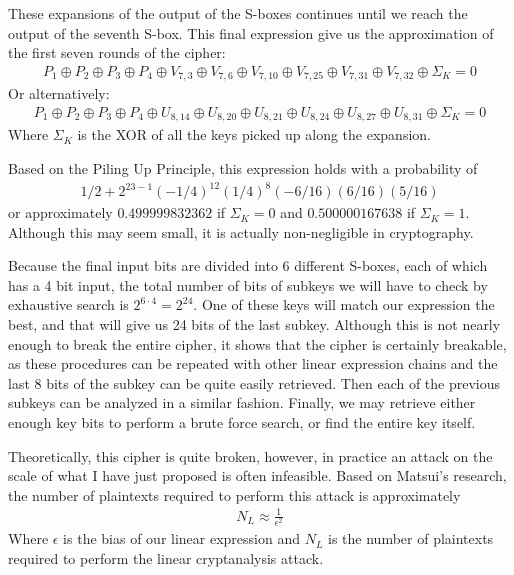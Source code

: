 \documentclass[12pt, a4paper, final]{report}
\begin{document}
These expansions of the output of the S-boxes continues until we reach the output of
the seventh S-box. This final expression give us the approximation of the first seven
rounds of the cipher:
\begin{align*}
    P_1 \oplus P_2 \oplus P_3 \oplus P_4 \oplus V_{7,3} \oplus V_{7,6} \oplus V_{7,10}
    \oplus V_{7,25} \oplus V_{7,31} \oplus V_{7,32} \oplus \Sigma_K= 0
\end{align*}
Or alternatively:
\begin{align*}
    P_1 \oplus P_2 \oplus P_3 \oplus P_4 \oplus U_{8,14} \oplus U_{8,20} \oplus
    U_{8,21} \oplus U_{8,24} \oplus U_{8,27} \oplus U_{8,31} \oplus \Sigma_K = 0
\end{align*}
Where $\Sigma_K$ is the XOR of all the keys picked up along the expansion.

Based on the Piling Up Principle, this
expression holds with a probability of
\begin{align*}
1/2 + 2^{23-1}(-1/4)^12(1/4)^8(-6/16)(6/16)(5/16)
\end{align*}
or approximately $0.499999832362$ if $\Sigma_K = 0$ and $0.500000167638$ if
$\Sigma_K = 1$. Although this may seem small, it is actually non-negligible
in cryptography.

Because the final input bits are divided into 6 different S-boxes, each of which
has a 4 bit input, the total number of bits of subkeys we will have to check by
exhaustive search is $2^{6 \cdot 4} = 2^{24}$. One of these keys will match our
expression the best, and that will give us 24 bits of the last subkey. Although
this is not nearly enough to break the entire cipher, it shows that the cipher is
certainly breakable, as these procedures can be repeated with other linear
expression chains and the last 8 bits of the subkey can be quite easily retrieved.
Then each of the previous subkeys can be analyzed in a similar fashion. Finally,
we may retrieve either enough key bits to perform a brute force search, or find
the entire key itself.

Theoretically, this cipher is quite broken, however, in practice an attack on the
scale of what I have just proposed is often infeasible. Based on Matsui's
research, the number of plaintexts required to perform this
attack is approximately
\begin{align*}
    N_L \approx \frac{1}{\epsilon^2}
\end{align*}
Where $\epsilon$ is the bias of our linear expression and $N_L$ is the number of
plaintexts required to perform the linear cryptanalysis attack.
\end{document}
